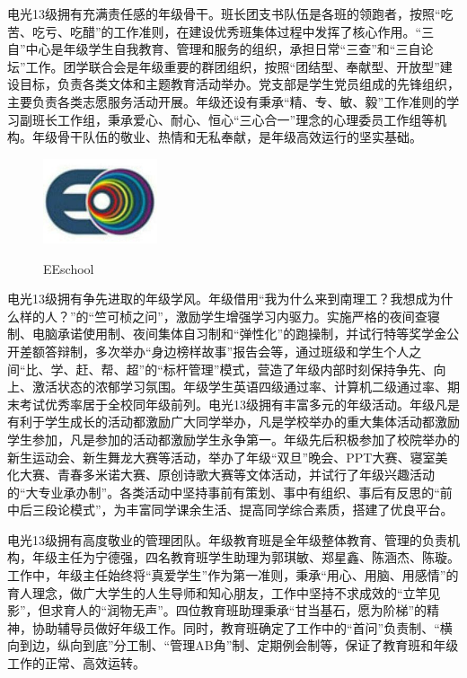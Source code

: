 \documentclass[a4paper,12pt]{report}
\begin{document}
\begin{spacing}{1.5}
电光13级拥有充满责任感的年级骨干。班长团支书队伍是各班的领跑者，按照“吃苦、吃亏、吃醋”的工作准则，在建设优秀班集体过程中发挥了核心作用。“三自”中心是年级学生自我教育、管理和服务的组织，承担日常“三查”和“三自论坛”工作。团学联合会是年级重要的群团组织，按照“团结型、奉献型、开放型”建设目标，负责各类文体和主题教育活动举办。党支部是学生党员组成的先锋组织，主要负责各类志愿服务活动开展。年级还设有秉承“精、专、敏、毅”工作准则的学习副班长工作组，秉承爱心、耐心、恒心“三心合一”理念的心理委员工作组等机构。年级骨干队伍的敬业、热情和无私奉献，是年级高效运行的坚实基础。

\begin{figure}
	\begin{center}
		\includegraphics[width=0.30\textwidth]{figure//Fig2.png}\\
	\end{center}
	\caption{EEschool}
\end{figure}

电光13级拥有争先进取的年级学风。年级借用“我为什么来到南理工？我想成为什么样的人？”的“竺可桢之问”，激励学生增强学习内驱力。实施严格的夜间查寝制、电脑承诺使用制、夜间集体自习制和“弹性化”的跑操制，并试行特等奖学金公开差额答辩制，多次举办“身边榜样故事”报告会等，通过班级和学生个人之间“比、学、赶、帮、超”的“标杆管理”模式，营造了年级内部时刻保持争先、向上、激活状态的浓郁学习氛围。年级学生英语四级通过率、计算机二级通过率、期末考试优秀率居于全校同年级前列。电光13级拥有丰富多元的年级活动。年级凡是有利于学生成长的活动都激励广大同学举办，凡是学校举办的重大集体活动都激励学生参加，凡是参加的活动都激励学生永争第一。年级先后积极参加了校院举办的新生运动会、新生舞龙大赛等活动，举办了年级“双旦”晚会、PPT大赛、寝室美化大赛、青春多米诺大赛、原创诗歌大赛等文体活动，并试行了年级兴趣活动的“大专业承办制”。各类活动中坚持事前有策划、事中有组织、事后有反思的“前中后三段论模式”，为丰富同学课余生活、提高同学综合素质，搭建了优良平台。

电光13级拥有高度敬业的管理团队。年级教育班是全年级整体教育、管理的负责机构，年级主任为宁德强，四名教育班学生助理为郭琪敏、郑星鑫、陈涵杰、陈璇。工作中，年级主任始终将“真爱学生”作为第一准则，秉承“用心、用脑、用感情”的育人理念，做广大学生的人生导师和知心朋友，工作中坚持不求成效的“立竿见影”，但求育人的“润物无声”。四位教育班助理秉承“甘当基石，愿为阶梯”的精神，协助辅导员做好年级工作。同时，教育班确定了工作中的“首问”负责制、“横向到边，纵向到底”分工制、“管理AB角”制、定期例会制等，保证了教育班和年级工作的正常、高效运转。


\end{spacing}
\end{document}
